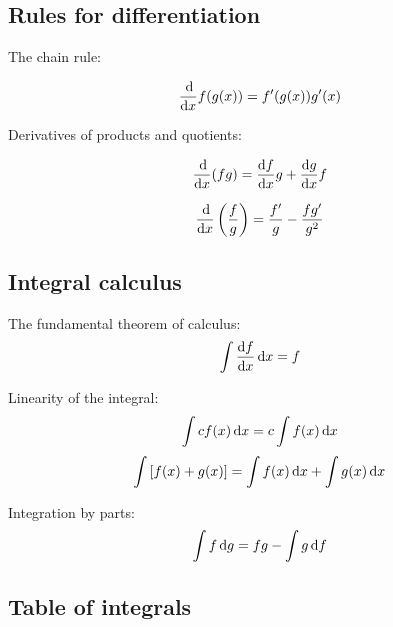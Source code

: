 \subsection{Rules for differentiation}

\noindent The chain rule:

\begin{equation*} \frac{\operatorname{d\!}}{\operatorname{d\!} x}f(g(x)) = f'(g(x))g'(x) \end{equation*}

\noindent Derivatives of products and quotients:

\begin{equation*} \frac{\operatorname{d\!}}{\operatorname{d\!} x} (fg) = \frac{\operatorname{d\!} f}{\operatorname{d\!} x} g + \frac{\operatorname{d\!} g}{\operatorname{d\!} x} f\end{equation*}

\begin{equation*} \frac{\operatorname{d\!}}{\operatorname{d\!} x}\left(\frac{f}{g}\right) = \frac{f'}{g}-\frac{fg'}{g^2}\end{equation*}

\subsection{Integral calculus}

\noindent The fundamental theorem of calculus:
\begin{equation*} \int \frac{\operatorname{d\!} f}{\operatorname{d\!} x}\operatorname{d\!} x = f \end{equation*}

\noindent Linearity of the integral:
\begin{equation*} \int cf(x)\operatorname{d\!} x = c\int f(x)\operatorname{d\!} x\end{equation*}
\begin{equation*} \int\left[f(x)+g(x)\right] = \int f(x) \operatorname{d\!} x + \int g(x) \operatorname{d\!} x \end{equation*}

\noindent Integration by parts:
\begin{equation*} \int f \operatorname{d\!} g = fg - \int g \operatorname{d\!} f \end{equation*}

\subsection{Table of integrals}


